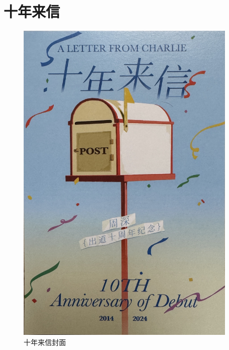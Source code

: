 \documentclass[]{ctexbook}
\begin{document}
\chapter{十年来信}\label{appendix-letter}

\begin{figure}

{\centering \includegraphics[width=300pt]{img/letter-cover} 

}

\caption{十年来信封面}\label{fig:unnamed-chunk-190}
\end{figure}

\newpage
\end{document}
